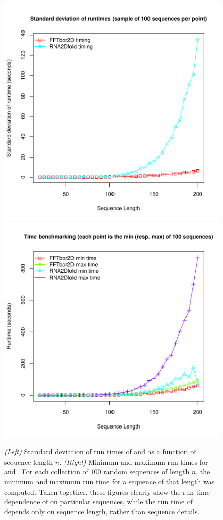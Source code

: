 \begin{figure}[!h]
\centering
\includegraphics[width=.45\linewidth]{Figures/FFTbor2D/ffttwoRtwofoldStdev.pdf}
\includegraphics[width=.45\linewidth]{Figures/FFTbor2D/ffttwoRtwofoldMinMax.pdf}
 \caption{
{\em (Left)}
Standard deviation of run times of \rtwofold and \ffttwo
as a function of sequence length $n$.
{\em (Right)}
Minimum and maximum run times for \rtwofold and \ffttwo.
For each collection of $100$ random sequences of length $n$, the minimum
and maximum run time for a sequence of that length was computed.
Taken together, these figures clearly show the
run time dependence of \rtwofold on particular sequences, while
the run time of \ffttwo depends only on sequence length, rather than
sequence details.
}
\label{fig:ffttwo:ffttwoRtwofoldStdevMinMax}
\end{figure}

